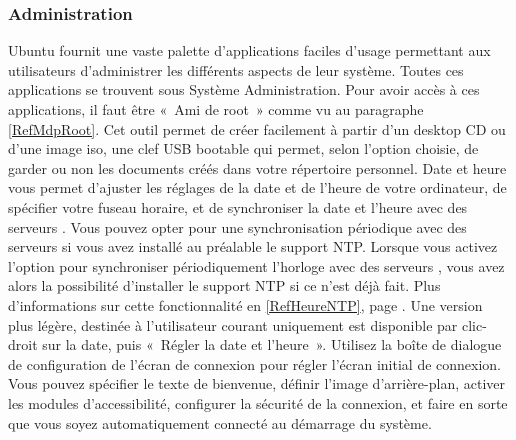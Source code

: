 \subsubsection{Administration}
Ubuntu fournit une vaste palette d'applications faciles d'usage permettant aux utilisateurs d'administrer les différents aspects de leur système. Toutes ces applications se trouvent sous Système \FlecheDroite Administration. Pour avoir accès à ces applications, il faut être «~Ami de root~» comme vu au paragraphe \ref{RefMdpRoot}.
Cet outil permet de créer facilement à partir d'un desktop CD ou d'une image iso, une clef USB bootable qui permet, selon l'option choisie, de garder ou non les documents créés dans votre répertoire personnel.
Date et heure vous permet d'ajuster les réglages de la date et de l'heure de votre ordinateur, de spécifier votre fuseau horaire, et de synchroniser la date et l'heure avec des serveurs . Vous pouvez opter pour une synchronisation périodique avec des serveurs  si vous avez installé au préalable le support NTP. Lorsque vous activez l'option pour synchroniser périodiquement l'horloge avec des serveurs , vous avez alors la possibilité d'installer le support NTP si ce n'est déjà fait. Plus d'informations sur cette fonctionnalité en \ref{RefHeureNTP}, page \pageref{RefHeureNTP}. Une version plus légère, destinée à l'utilisateur courant uniquement est disponible par clic-droit sur la date, puis «~Régler la date et l'heure~».
Utilisez la boîte de dialogue de configuration de l'écran de connexion pour régler l'écran initial de connexion. Vous pouvez spécifier le texte de bienvenue, définir l'image d'arrière-plan, activer les modules d'accessibilité, configurer la sécurité de la connexion, et faire en sorte que vous soyez automatiquement connecté au démarrage du système.
